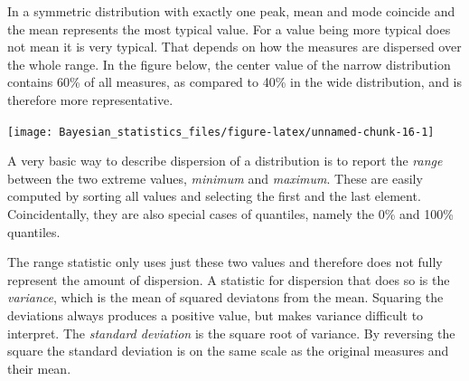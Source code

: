 \documentclass[]{svmono}
\newenvironment{Shaded}{\begin{snugshade}}{\end{snugshade}}
\newcommand{\KeywordTok}[1]{\textcolor[rgb]{0.13,0.29,0.53}{\textbf{#1}}}
\newcommand{\DataTypeTok}[1]{\textcolor[rgb]{0.13,0.29,0.53}{#1}}
\newcommand{\DecValTok}[1]{\textcolor[rgb]{0.00,0.00,0.81}{#1}}
\newcommand{\StringTok}[1]{\textcolor[rgb]{0.31,0.60,0.02}{#1}}
\newcommand{\OperatorTok}[1]{\textcolor[rgb]{0.81,0.36,0.00}{\textbf{#1}}}
\newcommand{\NormalTok}[1]{#1}
\begin{document}
In a symmetric distribution with exactly one peak, mean and mode
coincide and the mean represents the most typical value. For a value
being more typical does not mean it is very typical. That depends on how
the measures are dispersed over the whole range. In the figure below,
the center value of the narrow distribution contains 60\% of all
measures, as compared to 40\% in the wide distribution, and is therefore
more representative.

\begin{Shaded}
\end{Shaded}

\texttt{[image: Bayesian\_statistics\_files/figure-latex/unnamed-chunk-16-1]}

A very basic way to describe dispersion of a distribution is to report
the \emph{range} between the two extreme values, \emph{minimum} and
\emph{maximum}. These are easily computed by sorting all values and
selecting the first and the last element. Coincidentally, they are also
special cases of quantiles, namely the 0\% and 100\% quantiles.

The range statistic only uses just these two values and therefore does
not fully represent the amount of dispersion. A statistic for dispersion
that does so is the \emph{variance}, which is the mean of squared
deviatons from the mean. Squaring the deviations always produces a
positive value, but makes variance difficult to interpret. The
\emph{standard deviation} is the square root of variance. By reversing
the square the standard deviation is on the same scale as the original
measures and their mean.
\end{document}
